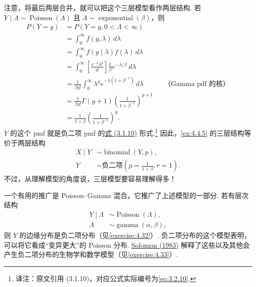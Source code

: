 注意，将最后两层合并，就可以把这个三层模型看作两层结构. 若 $Y\mid\Lambda\sim\operatorname{Poisson}(\Lambda)$ 且 $\Lambda\sim\operatorname{exponential}(\beta)$，则
$$\begin{aligned}
P(Y=y)&=P(Y=y,0<\Lambda<\infty)\\
&=\int_0^\infty f(y,\lambda)\,d\lambda\\
&=\int_0^\infty f(y\mid\lambda)f(\lambda)\,d\lambda\\
&=\int_0^\infty\left[\frac{e^{-\lambda}\lambda^y}{y!}\right]\frac1\beta e^{-\lambda/\beta}\,d\lambda\\
&=\frac1{\beta y!}\int_0^\infty\lambda^ye^{-\lambda(1+\beta^{-1})}\,d\lambda&&\text{（Gamma pdf 的核）}\\
&=\frac1{\beta y!}\Gamma(y+1)\left(\frac1{1+\beta^{-1}}\right)^{y+1}\\
&=\frac1{1+\beta}\left(\frac1{1+\beta^{-1}}\right)^y.
\end{aligned}$$
$Y$ 的这个 pmf 就是负二项 pmf 的\hyperref[eq:3.2.10]{式 (3.1.10)} 形式.\footnote{译注：原文引用 (3.1.10)，对应公式实际编号为\eqref{eq:3.2.10}.} 因此，\autoref{ex:4.4.5} 的三层结构等价于两层结构
$$\begin{aligned}
X\mid Y&\sim\operatorname{binomial}(Y,p),\\
Y&\sim\text{负二项}\left(p=\frac1{1+\beta},r=1\right).
\end{aligned}$$
不过，从理解模型的角度说，三层模型要容易理解得多！

一个有用的推广是 Poisson--Gamma 混合，它推广了上述模型的一部分. 若有层次结构
$$\begin{aligned}Y\mid\Lambda&\sim\operatorname{Poisson}(\Lambda),\\\Lambda&\sim\operatorname{gamma}(\alpha,\beta),\end{aligned}$$
则 $Y$ 的边缘分布是负二项分布（见\autoref{exercise:4.32}）. 负二项分布的这个模型表明，可以将它看成“变异更大”的 Poisson 分布. \hyperref[bib:source297]{Solomon (1983)} 解释了这些以及其他会产生负二项分布的生物学和数学模型（见\autoref{exercise:4.33}）.

